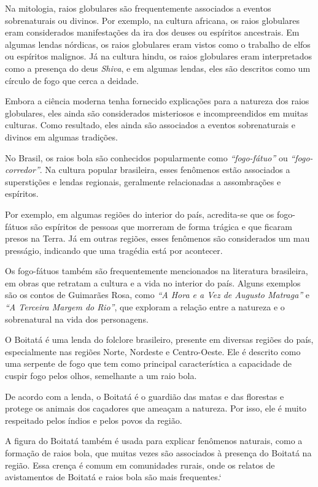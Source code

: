 \documentclass[a4paper, 12pt, onecolumn,singlespacing]{article}
\begin{document}
	Na mitologia, raios globulares são frequentemente associados a eventos sobrenaturais ou divinos. Por exemplo, na cultura africana, os raios globulares eram considerados manifestações da ira dos deuses ou espíritos ancestrais. Em algumas lendas nórdicas, os raios globulares eram vistos como o trabalho de elfos ou espíritos malignos. Já na cultura hindu, os raios globulares eram interpretados como a presença do deus \textit{Shiva}, e em algumas lendas, eles são descritos como um círculo de fogo que cerca a deidade.
	
	Embora a ciência moderna tenha fornecido explicações para a natureza dos raios globulares, eles ainda são considerados misteriosos e incompreendidos em muitas culturas. Como resultado, eles ainda são associados a eventos sobrenaturais e divinos em algumas tradições.
	
	No Brasil, os raios bola são conhecidos popularmente como \textit{``fogo-fátuo''} ou \textit{``fogo-corredor''}. Na cultura popular brasileira, esses fenômenos estão associados a superstições e lendas regionais, geralmente relacionadas a assombrações e espíritos.
	
	Por exemplo, em algumas regiões do interior do país, acredita-se que os fogo-fátuos são espíritos de pessoas que morreram de forma trágica e que ficaram presos na Terra. Já em outras regiões, esses fenômenos são considerados um mau presságio, indicando que uma tragédia está por acontecer.
	
	Os fogo-fátuos também são frequentemente mencionados na literatura brasileira, em obras que retratam a cultura e a vida no interior do país. Alguns exemplos são os contos de Guimarães Rosa, como \textit{``A Hora e a Vez de Augusto Matraga''} e \textit{``A Terceira Margem do Rio''}, que exploram a relação entre a natureza e o sobrenatural na vida dos personagens.
	
	O Boitatá é uma lenda do folclore brasileiro, presente em diversas regiões do país, especialmente nas regiões Norte, Nordeste e Centro-Oeste. Ele é descrito como uma serpente de fogo que tem como principal característica a capacidade de cuspir fogo pelos olhos, semelhante a um raio bola.
	
	De acordo com a lenda, o Boitatá é o guardião das matas e das florestas e protege os animais dos caçadores que ameaçam a natureza. Por isso, ele é muito respeitado pelos índios e pelos povos da região.
	
	A figura do Boitatá também é usada para explicar fenômenos naturais, como a formação de raios bola, que muitas vezes são associados à presença do Boitatá na região. Essa crença é comum em comunidades rurais, onde os relatos de avistamentos de Boitatá e raios bola são mais frequentes.`
	
	
\end{document}
